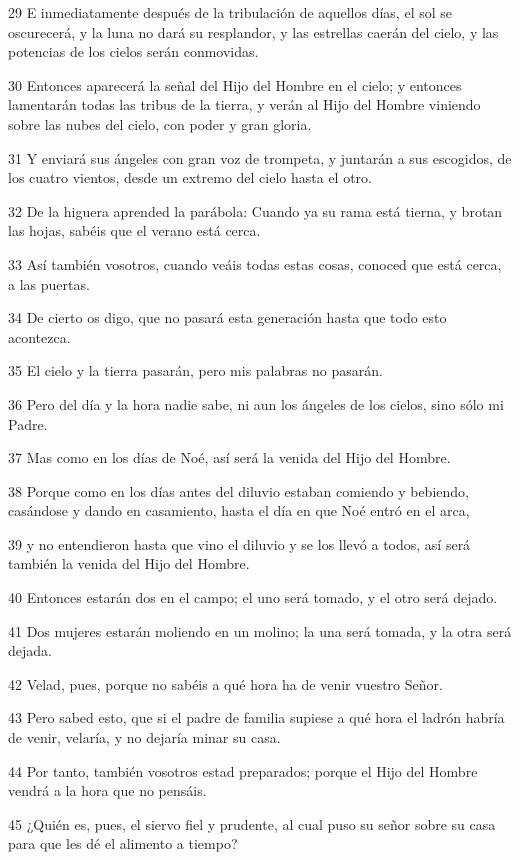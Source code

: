 \par 29 E inmediatamente después de la tribulación de aquellos días, el sol se oscurecerá, y la luna no dará su resplandor, y las estrellas caerán del cielo, y las potencias de los cielos serán conmovidas.
\par 30 Entonces aparecerá la señal del Hijo del Hombre en el cielo; y entonces lamentarán todas las tribus de la tierra, y verán al Hijo del Hombre viniendo sobre las nubes del cielo, con poder y gran gloria.
\par 31 Y enviará sus ángeles con gran voz de trompeta, y juntarán a sus escogidos, de los cuatro vientos, desde un extremo del cielo hasta el otro.
\par 32 De la higuera aprended la parábola: Cuando ya su rama está tierna, y brotan las hojas, sabéis que el verano está cerca.
\par 33 Así también vosotros, cuando veáis todas estas cosas, conoced que está cerca, a las puertas.
\par 34 De cierto os digo, que no pasará esta generación hasta que todo esto acontezca.
\par 35 El cielo y la tierra pasarán, pero mis palabras no pasarán.
\par 36 Pero del día y la hora nadie sabe, ni aun los ángeles de los cielos, sino sólo mi Padre.
\par 37 Mas como en los días de Noé, así será la venida del Hijo del Hombre.
\par 38 Porque como en los días antes del diluvio estaban comiendo y bebiendo, casándose y dando en casamiento, hasta el día en que Noé entró en el arca,
\par 39 y no entendieron hasta que vino el diluvio y se los llevó a todos, así será también la venida del Hijo del Hombre.
\par 40 Entonces estarán dos en el campo; el uno será tomado, y el otro será dejado.
\par 41 Dos mujeres estarán moliendo en un molino; la una será tomada, y la otra será dejada.
\par 42 Velad, pues, porque no sabéis a qué hora ha de venir vuestro Señor.
\par 43 Pero sabed esto, que si el padre de familia supiese a qué hora el ladrón habría de venir, velaría, y no dejaría minar su casa.
\par 44 Por tanto, también vosotros estad preparados; porque el Hijo del Hombre vendrá a la hora que no pensáis.
\par 45 ¿Quién es, pues, el siervo fiel y prudente, al cual puso su señor sobre su casa para que les dé el alimento a tiempo?
